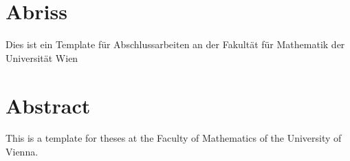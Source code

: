\section*{Abriss}
Dies ist ein Template für Abschlussarbeiten an der Fakultät für Mathematik der Universität Wien
\vspace{1.5cm}
\section*{Abstract}
This is a template for theses at the Faculty of Mathematics of the University of Vienna.